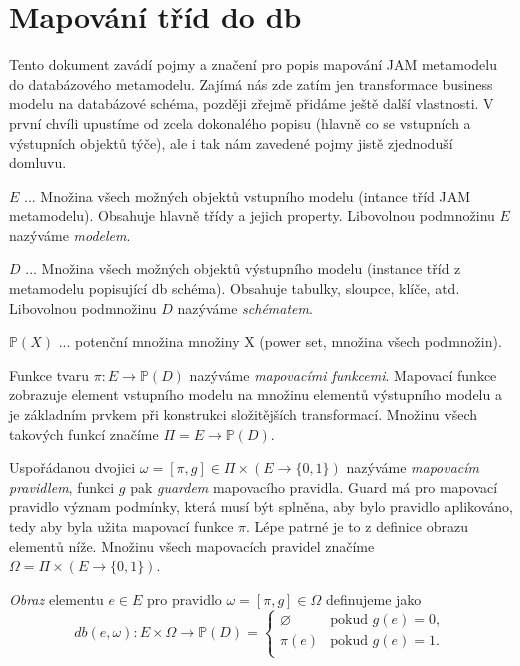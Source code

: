 \chapter{Mapování tříd do db}
\label{chap:mmmapping}

\newcommand{\ps}{\mathbb{P}}

Tento dokument zavádí pojmy a značení pro popis mapování JAM
metamodelu do databázového metamodelu. Zajímá nás zde zatím jen
transformace business modelu na databázové schéma, později zřejmě
přidáme ještě další vlastnosti. V první chvíli upustíme od zcela
dokonalého popisu (hlavně co se vstupních a výstupních objektů týče),
ale i tak nám zavedené pojmy jistě zjednoduší domluvu.

$E$ ... Množina všech možných objektů vstupního modelu (intance tříd
JAM metamodelu). Obsahuje hlavně třídy a jejich property. Libovolnou
podmnožinu $E$ nazýváme \emph{modelem}.

$D$ ... Množina všech možných objektů výstupního modelu (instance tříd
z metamodelu popisující db schéma). Obsahuje tabulky, sloupce, klíče,
atd. Libovolnou podmnožinu $D$ nazýváme \emph{schématem}.

$\ps(X)$ ... potenční množina množiny X (power set, množina všech
podmnožin).

Funkce tvaru $\pi : E \to \ps(D)$ nazýváme \emph{mapovacími
  funkcemi}. Mapovací funkce zobrazuje element vstupního modelu na
množinu elementů výstupního modelu a je základním prvkem při
konstrukci složitějších transformací.  Množinu všech takových funkcí
značíme $\Pi = E \to \ps(D)$.

Uspořádanou dvojici $\omega = [\pi, g] \in \Pi \times (E \to \{0,
1\})$ nazýváme \emph{mapovacím pravidlem}, funkci $g$ pak
\emph{guardem} mapovacího pravidla. Guard má pro mapovací pravidlo
význam podmínky, která musí být splněna, aby bylo pravidlo aplikováno,
tedy aby byla užita mapovací funkce $\pi$. Lépe patrné je to z
definice obrazu elementů níže. Množinu všech mapovacích pravidel
značíme $\Omega = \Pi \times (E \to \{0, 1\})$.

\emph{Obraz} elementu $e \in E$ pro pravidlo $\omega = [\pi, g] \in
\Omega$ definujeme jako 
\begin{equation}
  db(e,\omega) : E \times \Omega \to \ps(D) = \left\{
  \begin{array}{rl}
    \varnothing & \text{pokud } g(e) = 0,\\
    \pi(e) & \text{pokud } g(e) = 1.\\
  \end{array} \right.
\end{equation}


